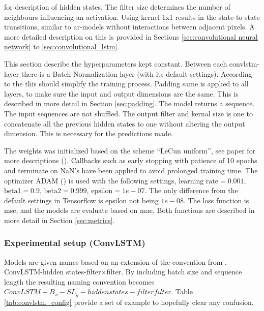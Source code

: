 for description of hidden states. 
The filter size determines the number of neighbours influencing an activation. Using kernel 1x1 results in the state-to-state transitions, similar to \acrshort{ar}-models without interactions between adjacent pixels. A more detailed description on this is provided in Sections \ref{sec:convolutional neural network} to \ref{sec:convolutional_lstm}. 

This section describe the hyperparameters kept constant. Between each \acrshort{convlstm}-layer there is a Batch Normalization layer (with its default settings). According to the  this should simplify the training process. Padding same is applied to all layers, to make sure the input and output dimensions are the same. This is described in more detail in Section \ref{sec:padding}. The model returns a sequence. The input sequences are not shuffled. The output filter and kernal size is one to concatenate all the previous hidden states to one without altering the output dimension. This is necessary for the predictions made.

The weights was initialized based on the scheme ``LeCun uniform'', see paper for more descriptions (\cite{Lecun98efficientbackprop}). Callbacks such as early stopping with patience of 10 epochs and terminate on NaN's have been applied to avoid prolonged training time. The optimizer ADAM (\cite{Kingma2015Adam:Optimization}) is used with the following settings, $\text{learning rate}=0.001$, $\text{beta1}=0.9$, $\text{beta2}=0.999$, $\text{epsilon}=1e-07$. The only difference from the default settings in Tensorflow is epsilon not being $1e-08$. The loss function is \acrfull{mse}, and the models are evaluate based on \acrfull{mae}.
Both functions are described in more detail in Section \ref{sec:metrics}. %

\subsubsection{Experimental setup (ConvLSTM)}
Models are given names based on an extension of the convention from , ConvLSTM-hidden states-filter$\times$filter. 
By including batch size and sequence length the resulting naming convention becomes \newline $ConvLSTM-B_{x}-SL_{y}-hidden states-filter$\times$filter$. Table \ref{tab:convlstm_config} provide a set of example to hopefully clear any confusion.

